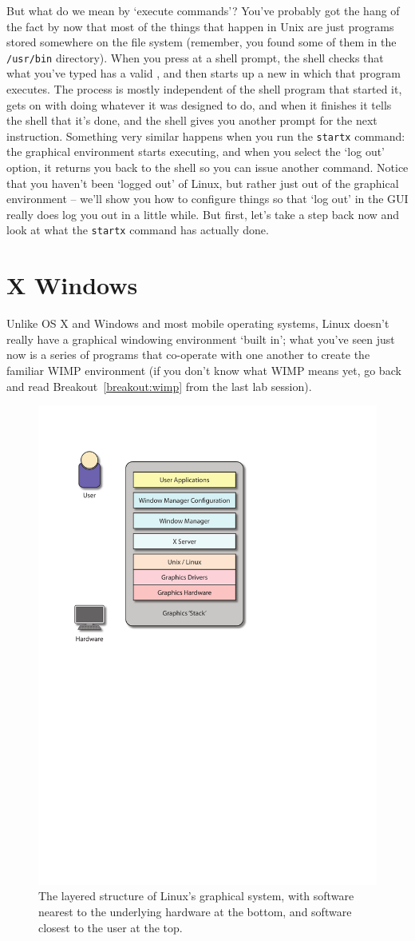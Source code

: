 But what do we mean by `execute commands'? You've probably got the hang of the fact by now that most of the things that happen in Unix are just programs stored somewhere on the file system (remember, you found some of them in the \texttt{/usr/bin} directory). When you press  at a shell prompt, the  shell checks that what you've typed has a valid , and then starts up a new  in which that program executes. The process is mostly independent of the shell program that started it, gets on with doing whatever it was designed to do, and when it finishes it tells the shell that it's done, and the shell gives you another prompt for the next instruction. Something very similar happens when you run the \texttt{startx} command: the graphical environment starts executing, and when you select the `log out' option, it returns you back to the shell so you can issue another command. Notice that you haven't been `logged out' of Linux, but rather just out of the graphical environment -- we'll show you how to configure things so that `log out' in the GUI really does log you out in a little while. But first, let's take a step back now and look at what the \texttt{startx} command has actually done. 

\section{X Windows}

Unlike OS X and Windows and most mobile operating systems, Linux doesn't really have a graphical windowing environment `built in'; what you've seen just now is a series of programs that co-operate with one another to  create the familiar WIMP environment (if you don't know what WIMP means yet, go back and read Breakout~\ref{breakout:wimp} from the last lab session).

\begin{figure}[htb]
  \begin{center}
    \includegraphics[width=.5\textwidth]{images/graphics-stack.pdf}
  \end{center}
\caption{The layered structure of Linux's graphical system, with software nearest to the underlying hardware at the bottom, and software closest to the user at the top.}
\label{figure:Xstructure}
\end{figure}

